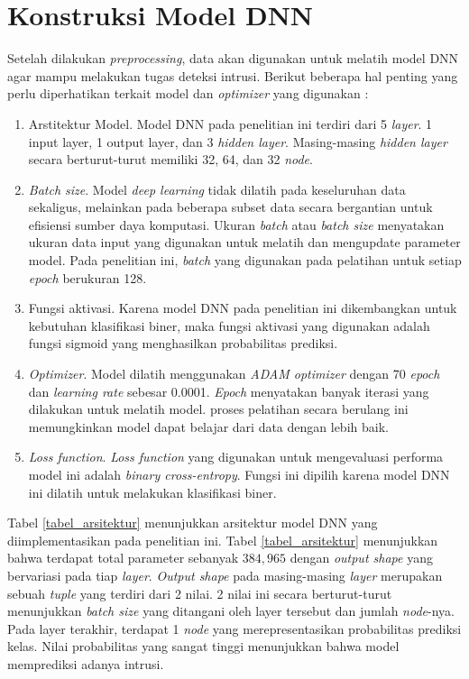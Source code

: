 \documentclass[a4paper,12pt]{report}
\begin{document}
\section{Konstruksi Model DNN} 
Setelah dilakukan \textit{preprocessing}, data akan digunakan untuk melatih model DNN agar mampu melakukan tugas deteksi intrusi. Berikut beberapa hal penting yang perlu diperhatikan terkait model dan \textit{optimizer} yang digunakan :

\begin{enumerate}
	\item Arstitektur Model. Model DNN pada penelitian ini terdiri dari 5 \textit{layer}. 1 input layer, 1 output layer, dan 3 \textit{hidden layer}. Masing-masing \textit{hidden layer} secara berturut-turut memiliki 32, 64, dan 32 \textit{node}. 
	
	\item \textit{Batch size}. Model \textit{deep learning} tidak dilatih pada keseluruhan data sekaligus, melainkan pada beberapa subset data secara bergantian untuk efisiensi sumber daya komputasi. Ukuran \textit{batch} atau \textit{batch size} menyatakan ukuran data input yang digunakan untuk melatih dan mengupdate parameter model. Pada penelitian ini, \textit{batch} yang digunakan pada pelatihan untuk setiap \textit{epoch} berukuran 128.
	
	\item Fungsi aktivasi. Karena model DNN pada penelitian ini dikembangkan untuk kebutuhan klasifikasi biner, maka fungsi aktivasi yang digunakan adalah fungsi sigmoid yang menghasilkan probabilitas prediksi.
	
	\item \textit{Optimizer}. Model dilatih menggunakan \textit{ADAM optimizer} dengan 70 \textit{epoch} dan \textit{learning rate} sebesar 0.0001. \textit{Epoch} menyatakan banyak iterasi yang dilakukan untuk melatih model. proses pelatihan secara berulang ini memungkinkan model dapat belajar dari data dengan lebih baik.
	
	\item \textit{Loss function}. \textit{Loss function} yang digunakan untuk mengevaluasi performa model ini adalah \textit{binary cross-entropy}. Fungsi ini dipilih karena model DNN ini dilatih untuk melakukan klasifikasi biner.
\end{enumerate}

Tabel \ref{tabel_arsitektur} menunjukkan arsitektur model DNN yang diimplementasikan pada penelitian ini. Tabel \ref{tabel_arsitektur} menunjukkan bahwa terdapat total parameter sebanyak $384,965$ dengan \textit{output shape} yang bervariasi pada tiap \textit{layer}. \textit{Output shape} pada masing-masing \textit{layer} merupakan sebuah \textit{tuple} yang terdiri dari 2 nilai. 2 nilai ini secara berturut-turut menunjukkan \textit{batch size} yang ditangani oleh layer tersebut dan jumlah \textit{node}-nya. Pada layer terakhir, terdapat 1 \textit{node} yang merepresentasikan probabilitas prediksi kelas. Nilai probabilitas yang sangat tinggi menunjukkan bahwa model memprediksi adanya intrusi.
\end{document}
